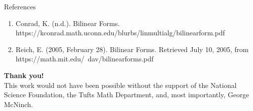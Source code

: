 \documentclass[svgnames]{beamer}
\begin{document}
\begin{frame}{References}
\begin{enumerate}
\item Conrad, K. (n.d.). Bilinear Forms. https://kconrad.math.uconn.edu/blurbs/linmultialg/bilinearform.pdf
\item Reich, E. (2005, February 28). Bilinear Forms. Retrieved July 10, 2005, from https://math.mit.edu/~dav/bilinearforms.pdf

\end{enumerate}
\end{frame}


\begin{frame}
	    \begin{center}
	        \textbf{Thank you!}\\
	        
	        This work would not have been possible without the support of the National Science Foundation, the Tufts Math Department, and, most importantly, George McNinch.
         \bigbreak
         \LARGE
       
	    \end{center}
\end{frame}
\end{document}
